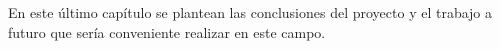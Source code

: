 En este último capítulo se plantean las conclusiones del proyecto y el trabajo a futuro que sería conveniente realizar en este campo.